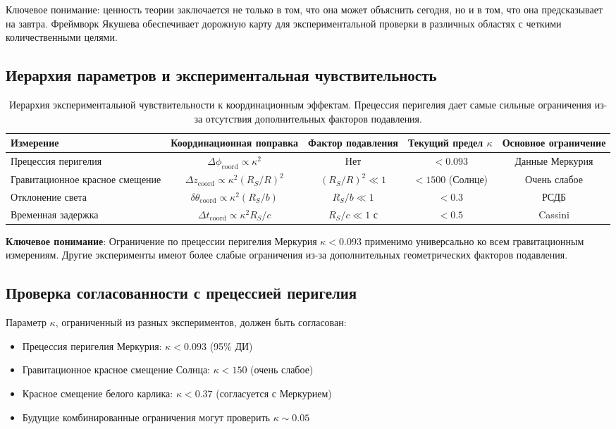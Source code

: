 \documentclass[11pt,a4paper]{article}
\begin{document}
	Ключевое понимание: ценность теории заключается не только в том, что она может объяснить сегодня, но и в том, что она предсказывает на завтра. Фреймворк Якушева обеспечивает дорожную карту для экспериментальной проверки в различных областях с четкими количественными целями.
	\subsection{Иерархия параметров и экспериментальная чувствительность}
	
	\begin{table}[htbp]
		\centering
		\scriptsize
		\begin{tabular}{lcccc}
			\toprule
			\textbf{Измерение} & \textbf{Координационная поправка} & \textbf{Фактор подавления} & \textbf{Текущий предел $\kappa$} & \textbf{Основное ограничение} \\
			\midrule
			Прецессия перигелия & $\Delta\phi_{\text{coord}} \propto \kappa^2$ & Нет & $<0.093$ & Данные Меркурия \\
			Гравитационное красное смещение & $\Delta z_{\text{coord}} \propto \kappa^2(R_S/R)^2$ & $(R_S/R)^2 \ll 1$ & $<1500$ (Солнце) & Очень слабое \\
			Отклонение света & $\delta\theta_{\text{coord}} \propto \kappa^2(R_S/b)$ & $R_S/b \ll 1$ & $<0.3$ & РСДБ \\
			Временная задержка & $\Delta t_{\text{coord}} \propto \kappa^2 R_S/c$ & $R_S/c \ll 1$ с & $<0.5$ & Cassini \\
			\bottomrule
		\end{tabular}
		\caption{Иерархия экспериментальной чувствительности к координационным эффектам. Прецессия перигелия дает самые сильные ограничения из-за отсутствия дополнительных факторов подавления.}
		\label{tab:sensitivity-hierarchy}
	\end{table}
	
	\textbf{Ключевое понимание}: Ограничение по прецессии перигелия Меркурия $\kappa < 0.093$ применимо универсально ко всем гравитационным измерениям. Другие эксперименты имеют более слабые ограничения из-за дополнительных геометрических факторов подавления.
	\subsection{Проверка согласованности с прецессией перигелия}
	
	Параметр $\kappa$, ограниченный из разных экспериментов, должен быть согласован:
	\begin{itemize}
		\item Прецессия перигелия Меркурия: $\kappa < 0.093$ (95\% ДИ)
		\item Гравитационное красное смещение Солнца: $\kappa < 150$ (очень слабое)
		\item Красное смещение белого карлика: $\kappa < 0.37$ (согласуется с Меркурием)
		\item Будущие комбинированные ограничения могут проверить $\kappa \sim 0.05$
	\end{itemize}
	
\end{document}

